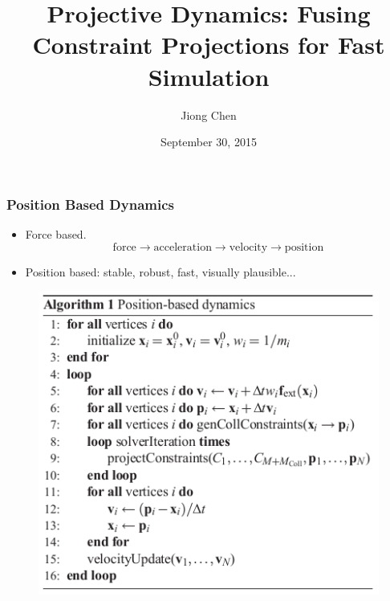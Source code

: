 \documentclass[serif,mathserif]{beamer}
\author[Jiong Chen]{Jiong Chen}
\title[\hspace{2em}\insertframenumber/\inserttotalframenumber]{Projective Dynamics: Fusing Constraint Projections for Fast Simulation}
\date{September 30, 2015} %
\begin{document}
\maketitle


\begin{frame}
  \frametitle{Position Based Dynamics}
  \begin{itemize}
    \item Force based.
      \begin{equation*}
	\text{force} \rightarrow \text{acceleration} \rightarrow \text{velocity} \rightarrow \text{position}
      \end{equation*}
    \item Position based: stable, robust, fast, visually plausible...
  \end{itemize}
  \begin{figure}[t]
      \centering
      \includegraphics[scale=0.4]{pic/pbd.png}
  \end{figure}
\end{frame}

\end{document}
